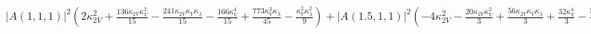 $
\left|{A{\left(1,1,1 \right)}}\right|^{2} \left(2 \kappa_{2V}^{2} + \frac{136 \kappa_{2V} \kappa_{V}^{2}}{15} - \frac{241 \kappa_{2V} \kappa_{V} \kappa_{\lambda}}{15} - \frac{166 \kappa_{V}^{4}}{15} + \frac{773 \kappa_{V}^{3} \kappa_{\lambda}}{45} - \frac{\kappa_{V}^{2} \kappa_{\lambda}^{2}}{9}\right)
+ \left|{A{\left(1.5,1,1 \right)}}\right|^{2}  \left(- 4 \kappa_{2V}^{2} - \frac{20 \kappa_{2V} \kappa_{V}^{2}}{3} + \frac{56 \kappa_{2V} \kappa_{V} \kappa_{\lambda}}{3} + \frac{32 \kappa_{V}^{4}}{3} - \frac{56 \kappa_{V}^{3} \kappa_{\lambda}}{3}\right)
+ \left|{A{\left(2,1,1 \right)}}\right|^{2} \left(2 \kappa_{2V}^{2} + \frac{4 \kappa_{2V} \kappa_{V}^{2}}{3} - \frac{19 \kappa_{2V} \kappa_{V} \kappa_{\lambda}}{3} - \frac{10 \kappa_{V}^{4}}{3} + \frac{19 \kappa_{V}^{3} \kappa_{\lambda}}{3}\right)
+ \left|{A{\left(1,0,1 \right)}}\right|^{2} \left(\frac{42 \kappa_{2V} \kappa_{V}^{2}}{25} - \frac{42 \kappa_{2V} \kappa_{V} \kappa_{\lambda}}{25} - \frac{17 \kappa_{V}^{4}}{25} + \frac{29 \kappa_{V}^{3} \kappa_{\lambda}}{50} + \frac{\kappa_{V}^{2} \kappa_{\lambda}^{2}}{10}\right)
+ \left|{A{\left(1,10,1 \right)}}\right|^{2} \left(- \frac{\kappa_{2V} \kappa_{V}^{2}}{75} + \frac{\kappa_{2V} \kappa_{V} \kappa_{\lambda}}{75} + \frac{\kappa_{V}^{4}}{75} - \frac{11 \kappa_{V}^{3} \kappa_{\lambda}}{450} + \frac{\kappa_{V}^{2} \kappa_{\lambda}^{2}}{90}\right) 
+ \left|{A{\left(1,1,1.5 \right)}}\right|^{2} \left(- \frac{16 \kappa_{2V} \kappa_{V}^{2}}{15} + \frac{16 \kappa_{2V} \kappa_{V} \kappa_{\lambda}}{15} + \frac{16 \kappa_{V}^{4}}{15} - \frac{16 \kappa_{V}^{3} \kappa_{\lambda}}{15}\right)
$
